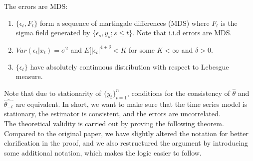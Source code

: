 \documentclass[12pt, oneside]{amsart}
\theoremstyle{definition}
\theoremstyle{remark}
\numberwithin{equation}{section}
\begin{document}
\begin{assumption}\label{assump3}
The errors are MDS: 
\begin{enumerate}
    \item $ \{ \epsilon_t,F_t \}$ form a sequence of martingale differences (MDS) where $F_t$ is the sigma field generated by $ \{ \epsilon_s, y_s;s \leq t \} $. Note that i.i.d errors are MDS.
    \item $Var(\epsilon_t | x_t) = \sigma^2$ and $E[|\epsilon_t|^{4+\delta} < K$ for some $K < \infty$ and $\delta > 0$.
    \item $\{\epsilon_t\}$ have absolutely continuous distribution with respect to Lebesgue measure. 
\end{enumerate}
\end{assumption}

Note that due to stationarity of $\{y_t\}^n_{t=1}$, conditions for the consistency of $\hat{\theta}$ and $\hat{\theta_{-t}}$ are equivalent. In short, we want to make sure that the time series model is stationary, the estimator is consistent, and the errors are uncorrelated.  \\

The theoretical validity is carried out by proving the following theorem. Compared to the original paper, we have slightly altered the notation for better clarification in the proof, and we also restructured the argument by introducing some additional notation, which makes the logic easier to follow.
\end{document}
